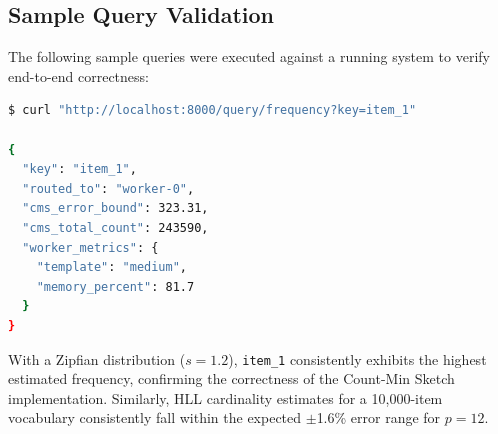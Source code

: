 \subsection{Sample Query Validation}
The following sample queries were executed against a running system to verify end-to-end correctness:

\begin{lstlisting}[language=bash, caption=Sample frequency query and response.]
$ curl "http://localhost:8000/query/frequency?key=item_1"

{
  "key": "item_1",
  "routed_to": "worker-0",
  "cms_error_bound": 323.31,
  "cms_total_count": 243590,
  "worker_metrics": {
    "template": "medium",
    "memory_percent": 81.7
  }
}
\end{lstlisting}

With a Zipfian distribution ($s = 1.2$), \texttt{item\_1} consistently exhibits the highest estimated frequency, confirming the correctness of the Count-Min Sketch implementation. Similarly, HLL cardinality estimates for a 10,000-item vocabulary consistently fall within the expected $\pm$1.6\% error range for $p = 12$.
